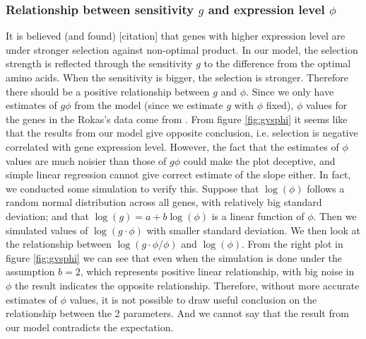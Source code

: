 \subsubsection{Relationship between sensitivity $g$ and expression level $\phi$}
It is believed (and found) [citation] that genes with higher expression level are under stronger selection against non-optimal product. 
In our model, the selection strength is reflected through the sensitivity $g$ to the difference from the optimal amino acids. 
When the sensitivity is bigger, the selection is stronger. 
Therefore there should be a positive relationship between $g$ and $\phi$. 
Since we only have estimates of $g\phi$ from the model (since we estimate $g$ with $\phi$ fixed), $\phi$ values for the genes in the Rokas's data come from \cite{Gilchrist2007}. 
From figure \ref{fig:gvsphi} it seems like that the results from our model give opposite conclusion, i.e. selection is negative correlated with gene expression level. 
However, the fact that the estimates of $\phi$ values are much noisier than those of $g\phi$ could make the plot deceptive, and simple linear regression cannot give correct estimate of the slope either. 
In fact, we conducted some simulation to verify this. 
Suppose that $\log(\phi)$ follows a random normal distribution across all genes, with relatively big standard deviation; and that $\log (g) = a + b\log(\phi)$ is a linear function of $\phi$. 
Then we simulated values of $\log(g\cdot \phi)$ with smaller standard deviation. 
We then look at the relationship between $\log(g\cdot\phi/\phi)$ and $\log(\phi)$. 
From the right plot in figure \ref{fig:gvsphi} we can see that even when the simulation is done under the assumption $b=2$, which represents positive linear relationship, with big noise in $\phi$ the result indicates the opposite relationship. 
Therefore, without more accurate estimates of $\phi$ values, it is not possible to draw useful conclusion on the relationship between the 2 parameters.
And we cannot say that the result from our model contradicts the expectation.

